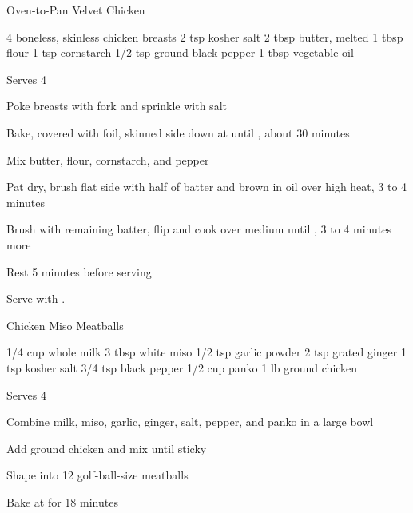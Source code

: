 \begin{denserecipe}{Oven-to-Pan Velvet Chicken}{}
\begin{ingredients}
4 boneless, skinless \ibreak chicken breasts
2 tsp kosher salt
2 tbsp butter, melted
1 tbsp flour
1 tsp cornstarch
1/2 tsp ground black \ibreak pepper
1 tbsp vegetable oil
\end{ingredients}
\nextcolumn
Serves 4
\begin{steps}
    \item Poke breasts with fork and sprinkle with salt
    \item Bake, covered with foil, skinned side down at  until , about 30 minutes
    \item Mix butter, flour, cornstarch, and pepper
    \item Pat dry, brush flat side with half of batter and brown in oil over high heat, 3 to 4 minutes
    \item Brush with remaining batter, flip and cook over medium until , 3 to 4 minutes more
    \item Rest 5 minutes before serving
\end{steps}
Serve with .
\end{denserecipe}

\begin{recipe}{Chicken Miso Meatballs}{}
\begin{ingredients}
1/4 cup whole milk
3 tbsp white miso
1/2 tsp garlic powder
2 tsp grated ginger
1 tsp kosher salt
3/4 tsp black pepper
1/2 cup panko
1 lb ground chicken
\end{ingredients}
\nextcolumn
Serves 4
\begin{steps}
    \item Combine milk, miso, garlic, ginger, salt, pepper, and panko in a large bowl
    \item Add ground chicken and mix until sticky
    \item Shape into 12 golf-ball-size meatballs
    \item Bake at  for 18 minutes
\end{steps}
\end{recipe}

